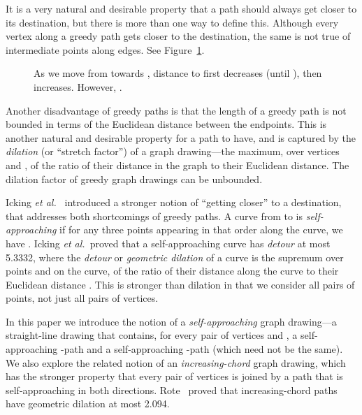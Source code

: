 \documentclass[11pt]{article}
\newcommand{\etal}{{\em et al.~}}
\begin{document}
It is a very natural and desirable property that a path should always get closer to its destination, but there is more than one way to define this.
Although every vertex along a greedy path gets closer to the destination, the same is not true of intermediate points along edges.
See Figure~\ref{fig:greedy-vs-SA}.


\begin{figure}
\centering


\caption{As we move from  towards , distance to  first decreases (until ), then increases. However, .}
\label{fig:greedy-vs-SA}
\end{figure}



Another disadvantage of greedy paths is that the
length of a greedy path is not bounded in terms of the Euclidean distance between the endpoints.
This is another natural and desirable property for a path to have, and is captured by the
\emph{dilation} (or ``stretch factor'') of a graph drawing---the maximum, over vertices  and , of the ratio of their distance in the graph to their Euclidean distance.
The dilation factor of greedy graph drawings can be unbounded.

Icking \etal\cite{Icking:self-approachingcurves:1995} introduced a stronger notion of
 ``getting closer'' to a destination, that addresses both shortcomings of greedy paths.
A curve from  to  is \emph{self-approaching} if for any three points  appearing in that order along the curve, we have .
Icking \etal proved that a self-approaching curve has \emph{detour} at most 5.3332, where the \emph{detour} or \emph{geometric dilation} of a curve is the supremum over points  and  on the curve, of the ratio of their distance along the curve to their Euclidean distance .
This is stronger than dilation in that we consider all pairs of points, not just all pairs of vertices.

In this paper we introduce the notion of a \emph{self-approaching} graph drawing---a straight-line drawing  that contains, for every pair of vertices  and ,
a self-approaching -path and a self-approaching -path (which need not be the same).
We also explore the related notion of an \emph{increasing-chord} graph drawing, which has the stronger property that every pair of vertices is joined by a path that is self-approaching in both directions.
Rote~\cite{Rote:ICcurves:1994} proved that increasing-chord paths have geometric dilation  at most 2.094.
\end{document}
